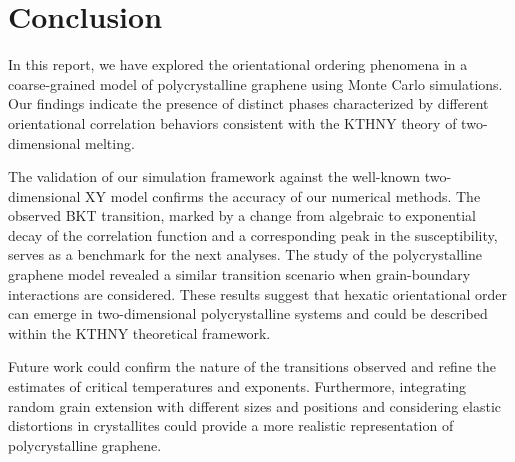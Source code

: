 \section{Conclusion}

In this report, we have explored the orientational ordering phenomena in a coarse-grained model of polycrystalline graphene using Monte Carlo simulations. Our findings indicate the presence of distinct phases characterized by different orientational correlation behaviors consistent with the KTHNY theory of two-dimensional melting.

The validation of our simulation framework against the well-known two-dimensional XY model confirms the accuracy of our numerical methods. The observed BKT transition, marked by a change from algebraic to exponential decay of the correlation function and a corresponding peak in the susceptibility, serves as a benchmark for the next analyses. The study of the polycrystalline graphene model revealed a similar transition scenario when grain-boundary interactions are considered. These results suggest that hexatic orientational order can emerge in two-dimensional polycrystalline systems and could be described within the KTHNY theoretical framework.

Future work could confirm the nature of the transitions observed and refine the estimates of critical temperatures and exponents. Furthermore, integrating random grain extension with different sizes and positions and considering elastic distortions in crystallites could provide a more realistic representation of polycrystalline graphene.
